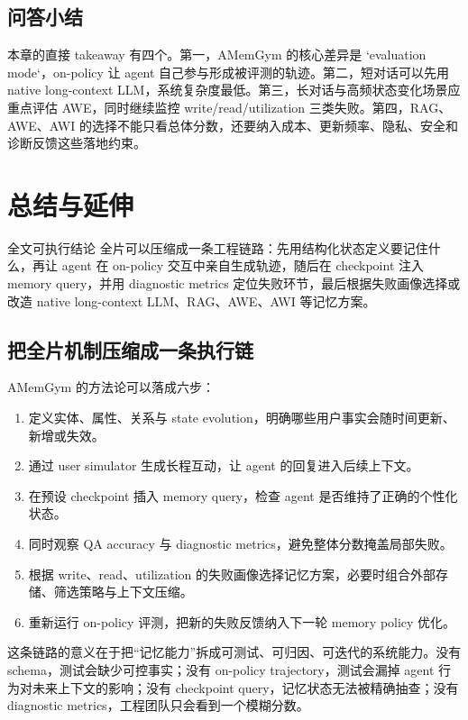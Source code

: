 \subsection{问答小结}

本章的直接 takeaway 有四个。第一，AMemGym 的核心差异是 `evaluation mode`，on-policy 让 agent 自己参与形成被评测的轨迹。第二，短对话可以先用 native long-context LLM，系统复杂度最低。第三，长对话与高频状态变化场景应重点评估 AWE，同时继续监控 write/read/utilization 三类失败。第四，RAG、AWE、AWI 的选择不能只看总体分数，还要纳入成本、更新频率、隐私、安全和诊断反馈这些落地约束。

\section{总结与延伸}

\begin{importantbox}{全文可执行结论}
全片可以压缩成一条工程链路：先用结构化状态定义要记住什么，再让 agent 在 on-policy 交互中亲自生成轨迹，随后在 checkpoint 注入 memory query，并用 diagnostic metrics 定位失败环节，最后根据失败画像选择或改造 native long-context LLM、RAG、AWE、AWI 等记忆方案。
\end{importantbox}

\subsection{把全片机制压缩成一条执行链}

AMemGym 的方法论可以落成六步：

\begin{enumerate}
  \item 定义实体、属性、关系与 state evolution，明确哪些用户事实会随时间更新、新增或失效。
  \item 通过 user simulator 生成长程互动，让 agent 的回复进入后续上下文。
  \item 在预设 checkpoint 插入 memory query，检查 agent 是否维持了正确的个性化状态。
  \item 同时观察 QA accuracy 与 diagnostic metrics，避免整体分数掩盖局部失败。
  \item 根据 write、read、utilization 的失败画像选择记忆方案，必要时组合外部存储、筛选策略与上下文压缩。
  \item 重新运行 on-policy 评测，把新的失败反馈纳入下一轮 memory policy 优化。
\end{enumerate}

这条链路的意义在于把“记忆能力”拆成可测试、可归因、可迭代的系统能力。没有 schema，测试会缺少可控事实；没有 on-policy trajectory，测试会漏掉 agent 行为对未来上下文的影响；没有 checkpoint query，记忆状态无法被精确抽查；没有 diagnostic metrics，工程团队只会看到一个模糊分数。

